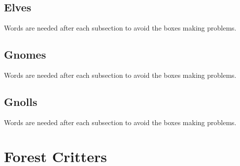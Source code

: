 \documentclass[a4paper,openany]{book}
\begin{document}
\begin{multicols}{2}

\subsection{Elves}
Words are needed after each subsection to avoid the boxes making problems.



\elf

\elf


\dryad

\subsection{Gnomes}
Words are needed after each subsection to avoid the boxes making problems.



\randomthree
\gnome

\gnomishsoldier

\gnomishsoldier

\gnomishillusionist

\subsection{Gnolls}
Words are needed after each subsection to avoid the boxes making problems.



\gnollhunter

\gnollshaman

\showStdSpells

\gnollshaman

\showStdSpells[\setcounter{enc}{1}]


\end{multicols}

\section{Forest Critters}

\begin{multicols}{2}

\bear

\boar

\chitincrawler

\basilisk

\wolf

\woodspy

\end{multicols}
\end{document}
